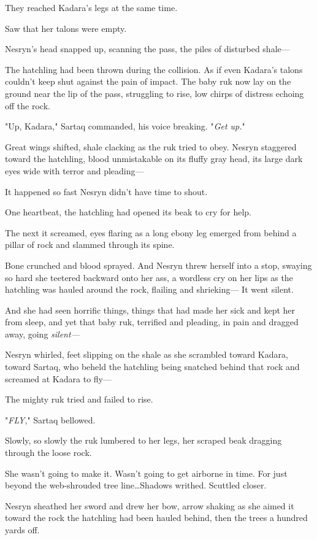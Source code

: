 They reached Kadara's legs at the same time.

Saw that her talons were empty.

Nesryn's head snapped up, scanning the pass, the piles of disturbed shale---

The hatchling had been thrown during the collision.
As if even Kadara's talons couldn't keep shut against the pain of impact.
The baby ruk now lay on the ground near the lip of the pass, struggling to rise, low chirps of distress echoing off the rock.

"Up, Kadara," Sartaq commanded, his voice breaking.
"\emph{Get up.}"

Great wings shifted, shale clacking as the ruk tried to obey.
Nesryn staggered toward the hatchling, blood unmistakable on its fluffy gray head, its large dark eyes wide with terror and pleading---

It happened so fast Nesryn didn't have time to shout.

One heartbeat, the hatchling had opened its beak to cry for help.

The next it screamed, eyes flaring as a long ebony leg emerged from behind a pillar of rock and slammed through its spine.

Bone crunched and blood sprayed.
And Nesryn threw herself into a stop, swaying so hard she teetered backward onto her ass, a wordless cry on her lips as the hatchling was hauled around the rock, flailing and shrieking--- It went silent.

And she had seen horrific things, things that had made her sick and kept her from sleep, and yet that baby ruk, terrified and pleading, in pain and dragged away, going \emph{silent---}

Nesryn whirled, feet slipping on the shale as she scrambled toward Kadara, toward Sartaq, who beheld the hatchling being snatched behind that rock and screamed at Kadara to fly---

The mighty ruk tried and failed to rise.

"\emph{FLY}," Sartaq bellowed.

Slowly, so slowly the ruk lumbered to her legs, her scraped beak dragging through the loose rock.

She wasn't going to make it.
Wasn't going to get airborne in time.
For just beyond the web-shrouded tree line\ldots Shadows writhed.
Scuttled closer.

Nesryn sheathed her sword and drew her bow, arrow shaking as she aimed it toward the rock the hatchling had been hauled behind, then the trees a hundred yards off.

